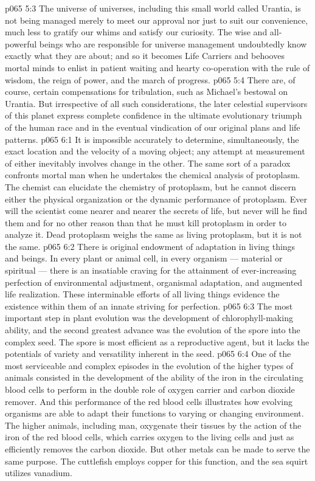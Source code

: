 \vs p065 5:3 The universe of universes, including this small world called Urantia, is not being managed merely to meet our approval nor just to suit our convenience, much less to gratify our whims and satisfy our curiosity. The wise and all\hyp{}powerful beings who are responsible for universe management undoubtedly know exactly what they are about; and so it becomes Life Carriers and behooves mortal minds to enlist in patient waiting and hearty co\hyp{}operation with the rule of wisdom, the reign of power, and the march of progress.
\vs p065 5:4 There are, of course, certain compensations for tribulation, such as Michael’s bestowal on Urantia. But irrespective of all such considerations, the later celestial supervisors of this planet express complete confidence in the ultimate evolutionary triumph of the human race and in the eventual vindication of our original plans and life patterns.
\vs p065 6:1 It is impossible accurately to determine, simultaneously, the exact location and the velocity of a moving object; any attempt at measurement of either inevitably involves change in the other. The same sort of a paradox confronts mortal man when he undertakes the chemical analysis of protoplasm. The chemist can elucidate the chemistry of  protoplasm, but he cannot discern either the physical organization or the dynamic performance of  protoplasm. Ever will the scientist come nearer and nearer the secrets of life, but never will he find them and for no other reason than that he must kill protoplasm in order to analyze it. Dead protoplasm weighs the same as living protoplasm, but it is not the same.
\vs p065 6:2 \pc There is original endowment of adaptation in living things and beings. In every  plant or animal cell, in every  organism --- material or spiritual --- there is an insatiable craving for the attainment of ever\hyp{}increasing perfection of environmental adjustment, organismal adaptation, and augmented life realization. These interminable efforts of all living things evidence the existence within them of an innate striving for perfection.
\vs p065 6:3 The most important step in plant evolution was the development of chlorophyll\hyp{}making ability, and the second greatest advance was the evolution of the spore into the complex seed. The spore is most efficient as a reproductive agent, but it lacks the potentials of variety and versatility inherent in the seed.
\vs p065 6:4 One of the most serviceable and complex episodes in the evolution of the higher types of animals consisted in the development of the ability of the iron in the circulating blood cells to perform in the double role of oxygen carrier and carbon dioxide remover. And this performance of the red blood cells illustrates how evolving organisms are able to adapt their functions to varying or changing environment. The higher animals, including man, oxygenate their tissues by the action of the iron of the red blood cells, which carries oxygen to the living cells and just as efficiently removes the carbon dioxide. But other metals can be made to serve the same purpose. The cuttlefish employs copper for this function, and the sea squirt utilizes vanadium.

